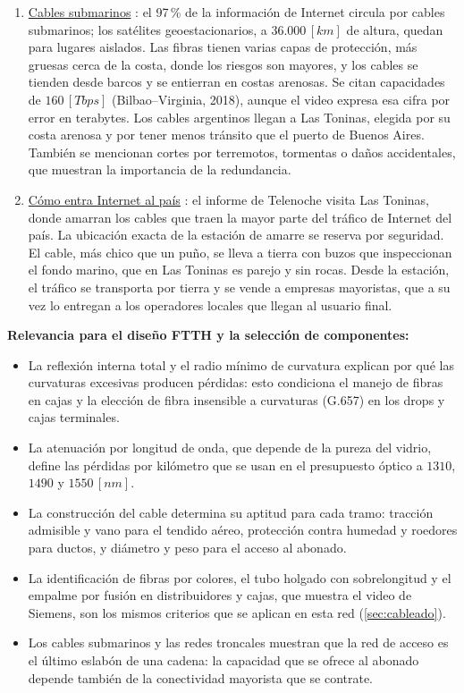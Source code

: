 \begin{enumerate}
    \item \underline{Cables submarinos} \cite{video4}: el 97\,\% de la información de Internet circula por cables submarinos; los satélites geoestacionarios, a $36.000 \, [km]$ de altura, quedan para lugares aislados. Las fibras tienen varias capas de protección, más gruesas cerca de la costa, donde los riesgos son mayores, y los cables se tienden desde barcos y se entierran en costas arenosas. Se citan capacidades de $160 \, [Tbps]$ (Bilbao--Virginia, 2018), aunque el video expresa esa cifra por error en terabytes. Los cables argentinos llegan a Las Toninas, elegida por su costa arenosa y por tener menos tránsito que el puerto de Buenos Aires. También se mencionan cortes por terremotos, tormentas o daños accidentales, que muestran la importancia de la redundancia.
    \item \underline{Cómo entra Internet al país} \cite{video5}: el informe de Telenoche visita Las Toninas, donde amarran los cables que traen la mayor parte del tráfico de Internet del país. La ubicación exacta de la estación de amarre se reserva por seguridad. El cable, más chico que un puño, se lleva a tierra con buzos que inspeccionan el fondo marino, que en Las Toninas es parejo y sin rocas. Desde la estación, el tráfico se transporta por tierra y se vende a empresas mayoristas, que a su vez lo entregan a los operadores locales que llegan al usuario final.
\end{enumerate}

\textbf{Relevancia para el diseño FTTH y la selección de componentes:}
\begin{itemize}
    \item La reflexión interna total y el radio mínimo de curvatura explican por qué las curvaturas excesivas producen pérdidas: esto condiciona el manejo de fibras en cajas y la elección de fibra insensible a curvaturas (G.657) en los drops y cajas terminales.
    \item La atenuación por longitud de onda, que depende de la pureza del vidrio, define las pérdidas por kilómetro que se usan en el presupuesto óptico a $1310$, $1490$ y $1550 \, [nm]$.
    \item La construcción del cable determina su aptitud para cada tramo: tracción admisible y vano para el tendido aéreo, protección contra humedad y roedores para ductos, y diámetro y peso para el acceso al abonado.
    \item La identificación de fibras por colores, el tubo holgado con sobrelongitud y el empalme por fusión en distribuidores y cajas, que muestra el video de Siemens, son los mismos criterios que se aplican en esta red (\autoref{sec:cableado}).
    \item Los cables submarinos y las redes troncales muestran que la red de acceso es el último eslabón de una cadena: la capacidad que se ofrece al abonado depende también de la conectividad mayorista que se contrate.
\end{itemize}

